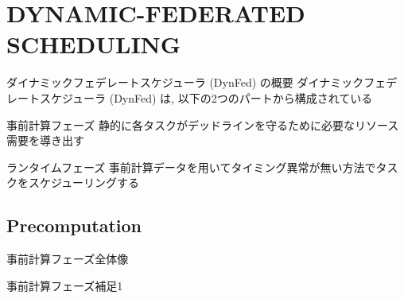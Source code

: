
\section{DYNAMIC-FEDERATED SCHEDULING}
\label{sec: DYNAMIC-FEDERATED SCHEDULING}

\begin{frame}{ダイナミックフェデレートスケジューラ (DynFed) の概要}
    ダイナミックフェデレートスケジューラ (DynFed) は, 以下の2つのパートから構成されている
    \begin{block}{事前計算フェーズ}
        静的に各タスクがデッドラインを守るために必要なリソース需要を導き出す
    \end{block}
    \begin{block}{ランタイムフェーズ}
        事前計算データを用いてタイミング異常が無い方法でタスクをスケジューリングする
    \end{block}
\end{frame}


\subsection{Precomputation}
\label{ssec: Precomputation}

\begin{frame}{事前計算フェーズ全体像}
\end{frame}

\begin{frame}{事前計算フェーズ補足1}
\end{frame}

